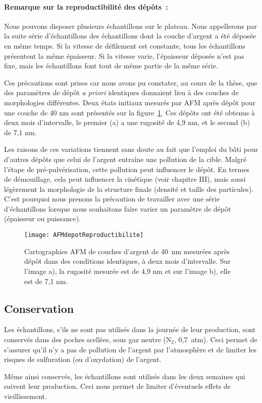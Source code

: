 \paragraph*{Remarque sur la reproductibilité des dépôts~:} Nous pouvons disposer plusieurs échantillons sur le plateau. Nous appellerons par la suite \og série d'échantillons \fg{} des échantillons dont la couche d'argent a été déposée en même temps. Si la vitesse de défilement est constante, tous les échantillons présentent la même épaisseur. Si la vitesse varie, l'épaisseur déposée n'est pas fixe, mais les échantillons font tout de même partie de la même série.\par 
Ces précautions sont prises car nous avons pu constater, au cours de la thèse, que des paramètres de dépôt \textit{a priori} identiques donnaient lieu à des couches de morphologies différentes. Deux états initiaux mesurés par AFM après dépôt pour une couche de 40 nm sont présentés sur la figure~\ref{AFMdepotReproductibilite}. Ces dépôts ont été obtenus à deux mois d'intervalle, le premier (a) a une rugosité de 4,9 nm, et le second (b) de 7,1 nm.\par 
Les raisons de ces variations tiennent sans doute au fait que l'emploi du bâti pour d'autres dépôts que celui de l'argent entraîne une pollution de la cible. Malgré l'étape de pré-pulvérisation, cette pollution peut influencer le dépôt. En termes de démouillage, cela peut influencer la cinétique (voir chapitre III), mais aussi légèrement la morphologie de la structure finale (densité et taille des particules). C'est pourquoi nous prenons la précaution de travailler avec une série d'échantillons lorsque nous souhaitons faire varier un paramètre de dépôt (épaisseur ou puissance).\par 

\begin{figure}[!htb]
\centering
\texttt{[image: AFMdepotReproductibilite]}
\caption{Cartographies AFM de couches d'argent de 40~nm mesurées après dépôt dans des conditions identiques, à deux mois d'intervalle. Sur l'image a), la rugosité mesurée est de 4,9 nm et sur l'image b), elle est de 7,1 nm.}
\label{AFMdepotReproductibilite}
\end{figure}

	\subsection{Conservation}
Les échantillons, s'ils ne sont pas utilisés dans la journée de leur production, sont conservés dans des poches scellées, sous gaz neutre (N$_2$, 0,7~atm). Ceci permet de s'assurer qu'il n'y a pas de pollution de l'argent par l'atmosphère et de limiter les risques de sulfuration (ou d'oxydation) de l'argent.\par 
Même ainsi conservés, les échantillons sont utilisés dans les deux semaines qui suivent leur production. Ceci nous permet de limiter d'éventuels effets de vieillissement.\par 

